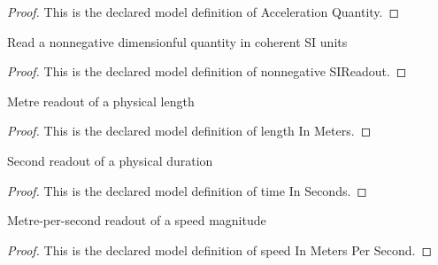 \begin{proof}
  This is the declared model definition of Acceleration Quantity.
\end{proof}
\begin{definition}
  \label{def:physics:phyx-mini-0684:phyxminiproblems-problemphyxmini0684-nonnegativesireadout}
  Read a nonnegative dimensionful quantity in coherent SI units
\end{definition}
\begin{proof}
  This is the declared model definition of nonnegative SIReadout.
\end{proof}
\begin{definition}
  \label{def:physics:phyx-mini-0684:phyxminiproblems-problemphyxmini0684-lengthinmeters}
  Metre readout of a physical length
\end{definition}
\begin{proof}
  This is the declared model definition of length In Meters.
\end{proof}
\begin{definition}
  \label{def:physics:phyx-mini-0684:phyxminiproblems-problemphyxmini0684-timeinseconds}
  Second readout of a physical duration
\end{definition}
\begin{proof}
  This is the declared model definition of time In Seconds.
\end{proof}
\begin{definition}
  \label{def:physics:phyx-mini-0684:phyxminiproblems-problemphyxmini0684-speedinmeterspersecond}
  Metre-per-second readout of a speed magnitude
\end{definition}
\begin{proof}
  This is the declared model definition of speed In Meters Per Second.
\end{proof}
